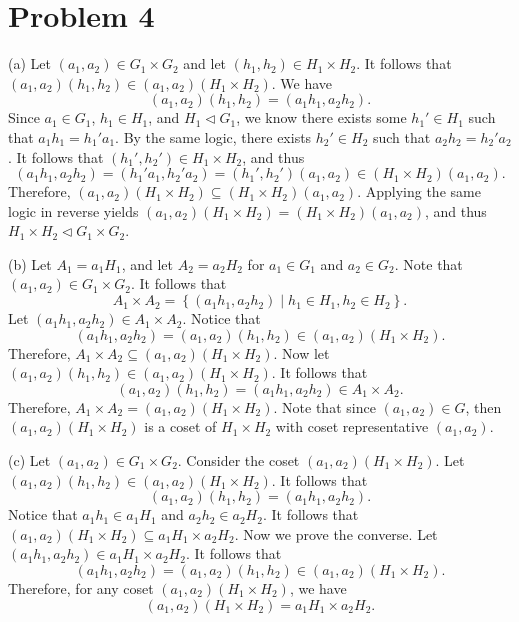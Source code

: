 \documentclass[11pt, letterpaper]{report}
\begin{document}
\section*{Problem 4}
\begin{solution}
	(a) Let $(a_1,a_2)\in G_1\times G_2$ and let $(h_1,h_2)\in H_1\times H_2$. It follows that $(a_1,a_2)(h_1,h_2)\in (a_1,a_2)(H_{1}\times H_2)$. We have
	\[
		(a_1,a_2)(h_1,h_2)=(a_1h_1,a_2h_2)
	.\]
	Since $a_1\in G_1$, $h_1\in H_1$, and $H_1\triangleleft G_1$, we know there exists some $h_1'\in H_1$ such that $a_1h_1=h_1'a_1$. By the same logic, there exists $h_2'\in H_2$ such that $a_2h_2=h_2'a_2$. It follows that $\left( h_1',h_2' \right) \in H_1\times H_2$, and thus
	\[
		(a_1h_1,a_2h_2)=\left( h_1'a_1,h_2'a_2 \right) =\left( h_1',h_2' \right) (a_1,a_2)\in \left( H_1\times H_2 \right) (a_1,a_2)
	.\]
	Therefore, $(a_1,a_2)(H_1\times H_2)\subseteq (H_1\times H_2)(a_1,a_2)$. Applying the same logic in reverse yields $(a_1,a_2)(H_1\times H_2)=(H_1\times H_2)(a_1,a_2)$, and thus $H_1\times H_2\triangleleft G_1\times G_2$.

	(b) Let $A_1=a_1H_1$, and let $A_2=a_2H_2$ for $a_1\in G_1$ and $a_2\in G_2$. Note that $(a_1,a_2)\in G_1\times G_2$. It follows that
	\[
		A_1\times A_2=\left\{ (a_1h_1,a_2h_2) \mid h_1\in H_1,h_2\in H_2 \right\} 
	.\]
	Let $(a_1h_1,a_2h_2)\in A_1\times A_2$. Notice that
	\[
		(a_1h_1,a_2h_2)=(a_1,a_2)(h_1,h_2)\in (a_1,a_2)(H_1\times H_2)
	.\]
	Therefore, $A_1\times A_2\subseteq (a_1,a_2)(H_1\times H_2)$. Now let $(a_1,a_2)(h_1,h_2)\in (a_1,a_2)(H_1\times H_2)$. It follows that
	\[
		(a_1,a_2)(h_1,h_2)=(a_1h_1,a_2h_2)\in A_1\times A_2
	.\]
	Therefore, $A_1\times A_2=(a_1,a_2)(H_1\times H_2)$. Note that since $(a_1,a_2)\in G$, then $(a_1,a_2)(H_1\times H_2)$ is a coset of $H_1\times H_2$ with coset representative $(a_1,a_2)$.

	(c) Let $(a_1,a_2)\in G_1\times G_2$. Consider the coset $(a_1,a_2)(H_1\times H_2)$. Let $(a_1,a_2)(h_1,h_2)\in (a_1,a_2)(H_1\times H_2)$. It follows that
	\[
		(a_1,a_2)(h_1,h_2)=(a_1h_1,a_2h_2)
	.\]
	Notice that $a_1h_1\in a_1H_1$ and $a_2h_2\in a_2H_2$. It follows that $(a_1,a_2)(H_1\times H_2)\subseteq a_1H_1\times a_2H_2$. Now we prove the converse. Let $(a_1h_1,a_2h_2)\in a_1H_1\times a_2H_2$. It follows that
	\[
		(a_1h_1,a_2h_2)=(a_1,a_2)(h_1,h_2)\in (a_1,a_2)(H_1\times H_2)
	.\]
	Therefore, for any coset $(a_1,a_2)(H_1\times H_2)$, we have
	\[
		(a_1,a_2)(H_1\times H_2)=a_1H_1\times a_2H_2
	.\]
	

\end{solution}
\end{document}
